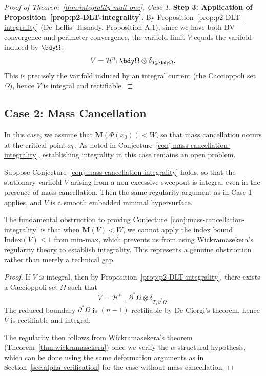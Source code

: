 \begin{proof}[Proof of Theorem~\ref{thm:integrality-mult-one}, Case 1]
\textbf{Step 3: Application of Proposition~\ref{prop:p2-DLT-integrality}.} By
Proposition~\ref{prop:p2-DLT-integrality} (De~Lellis--Tasnady, Proposition A.1), since we have both
BV convergence and perimeter convergence, the varifold limit $V$ equals the varifold induced by
$\bdy\Omega$:
\[
    V = \mathcal{H}^n \llcorner \bdy\Omega \otimes \delta_{T_x\bdy\Omega}.
\]
This is precisely the varifold induced by an integral current (the Caccioppoli set $\Omega$), hence
$V$ is integral and rectifiable.
\end{proof}

\subsection{Case 2: Mass Cancellation}

In this case, we assume that $\mathbf{M}(\Phi(x_0)) < W$, so that mass cancellation occurs at the critical point $x_0$. As noted in Conjecture~\ref{conj:mass-cancellation-integrality}, establishing integrality in this case remains an open problem.

\begin{proposition}\label{prop:regularity-with-cancellation}
    Suppose Conjecture~\ref{conj:mass-cancellation-integrality} holds, so that the stationary varifold $V$ arising from a non-excessive sweepout is integral even in the presence of mass cancellation. Then the same regularity argument as in Case 1 applies, and $V$ is a smooth embedded minimal hypersurface.
\end{proposition}

\begin{remark}
The fundamental obstruction to proving Conjecture~\ref{conj:mass-cancellation-integrality} is that when $\mathbf{M}(V) < W$, we cannot apply the index bound $\mathrm{Index}(V) \leq 1$ from min-max, which prevents us from using Wickramasekera's regularity theory to establish integrality. This represents a genuine obstruction rather than merely a technical gap.
\end{remark}

\begin{proof}
If $V$ is integral, then by Proposition~\ref{prop:p2-DLT-integrality}, there exists a Caccioppoli set $\Omega$ such that
\[
    V = \mathcal{H}^n \llcorner \partial^*\Omega \otimes \delta_{T_x\partial^*\Omega}.
\]
The reduced boundary $\partial^*\Omega$ is $(n-1)$-rectifiable by De Giorgi's theorem, hence $V$ is rectifiable and integral.

The regularity then follows from Wickramasekera's theorem (Theorem~\ref{thm:wickramasekera}) once we verify the $\alpha$-structural hypothesis, which can be done using the same deformation arguments as in Section~\ref{sec:alpha-verification} for the case without mass cancellation.
\end{proof}

